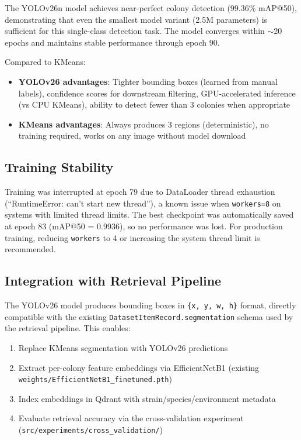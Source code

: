 \documentclass[11pt,a4paper]{article}
\begin{document}
The YOLOv26n model achieves near-perfect colony detection (99.36\% mAP@50), demonstrating that even the smallest model variant (2.5M parameters) is sufficient for this single-class detection task. The model converges within $\sim$20 epochs and maintains stable performance through epoch 90.

Compared to KMeans:
\begin{itemize}[nosep]
  \item \textbf{YOLOv26 advantages}: Tighter bounding boxes (learned from manual labels), confidence scores for downstream filtering, GPU-accelerated inference (vs CPU KMeans), ability to detect fewer than 3 colonies when appropriate
  \item \textbf{KMeans advantages}: Always produces 3 regions (deterministic), no training required, works on any image without model download
\end{itemize}

\subsection{Training Stability}

Training was interrupted at epoch 79 due to DataLoader thread exhaustion (``RuntimeError: can't start new thread''), a known issue when \texttt{workers=8} on systems with limited thread limits. The best checkpoint was automatically saved at epoch 83 (mAP@50 = 0.9936), so no performance was lost. For production training, reducing \texttt{workers} to 4 or increasing the system thread limit is recommended.

\subsection{Integration with Retrieval Pipeline}

The YOLOv26 model produces bounding boxes in \texttt{\{x, y, w, h\}} format, directly compatible with the existing \texttt{DatasetItemRecord.segmentation} schema used by the retrieval pipeline. This enables:
\begin{enumerate}[nosep]
  \item Replace KMeans segmentation with YOLOv26 predictions
  \item Extract per-colony feature embeddings via EfficientNetB1 (existing \texttt{weights/EfficientNetB1\_finetuned.pth})
  \item Index embeddings in Qdrant with strain/species/environment metadata
  \item Evaluate retrieval accuracy via the cross-validation experiment (\texttt{src/experiments/cross\_validation/})
\end{enumerate}
\end{document}
